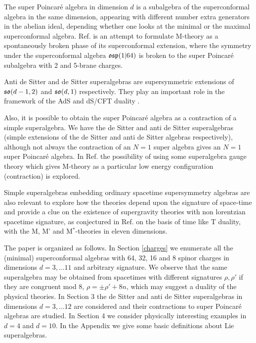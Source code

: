 \documentclass[a4paper,12pt]{article}
\begin{document}
 The super
Poincar\'e algebra in dimension $d$ is a subalgebra of the
superconformal algebra in the same dimension, appearing with
different number extra generators in the abelian ideal, depending
whether one looks at the minimal or the maximal superconformal
algebra. Ref.\cite{we}
 is an attempt to formulate M-theory as a spontaneously
broken phase of its superconformal extension, where the symmetry
under the  superconformal algebra $\mathfrak{osp}(1|64)$ is broken to the
super Poincar\'e subalgebra with 2 and 5-brane charges.

Anti de Sitter and de Sitter superalgebras are  supersymmetric
extensions of $\mathfrak{so}(d-1,2)$ and  $\mathfrak{so}(d,1)$ respectively. They
play an important role in the framework of the AdS and dS/CFT
duality \cite{agmoo,wi2,str,hu2}.



 Also, it is possible to obtain the super Poincar\'e
algebra as a contraction of a simple superalgebra. We have   the
de Sitter and anti de Sitter superalgebras (simple extensions of
the de Sitter and anti de Sitter algebras respectively), although
not always the contraction of an $N=1$ super algebra gives an
$N=1$ super Poincar\'e algebra. In Ref.\cite{ho} the possibility
of using some superalgebra gauge theory which gives M-theory  as a
particular low energy configuration (contraction) is explored.

Simple superalgebras embedding ordinary spacetime supersymmetry
algebras are also relevant to explore how the theories depend upon
the signature of space-time and provide a clue on the existence of
supergravity theories with non lorentzian spacetime signature, as
conjectured in Ref.\cite{hu} on the basis of time like T duality,
with the M, M' and  M$^*$-theories in eleven dimensions.

\smallskip

The paper is organized as follows. In Section \ref{charges} we
enumerate all the (minimal) superconformal algebras with 64, 32,
16 and 8 spinor charges in dimensions $d=3,\dots 11$ and arbitrary
signature. We observe that the same superalgebra may be obtained
from spacetimes with different signatures $\rho, \rho'$ if they
are congruent mod 8, $\rho=\pm \rho'+8n$, which may suggest a
duality of the physical theories. In Section 3 the de Sitter and
anti de Sitter superalgebras in dimensions $d=3,\dots 12$ are
considered and their contractions to super Poincar\'e algebras are
studied. In Section 4 we consider physically interesting examples
in $d=4$ and $d=10$. In the Appendix we give some basic
definitions about Lie superalgebras.
\end{document}
